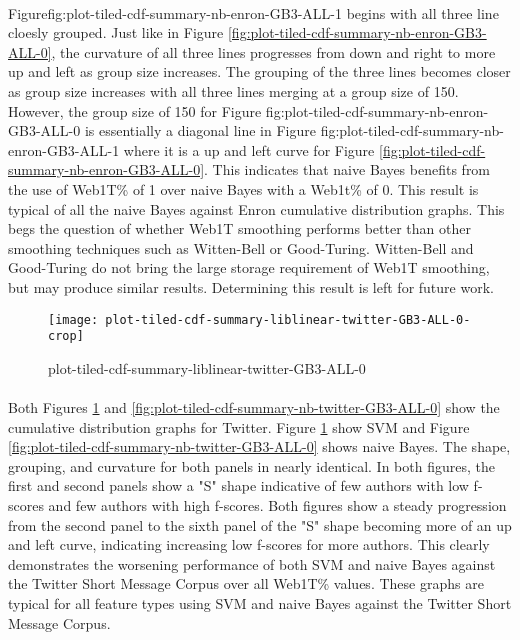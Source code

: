 \paragraph*{} Figure{fig:plot-tiled-cdf-summary-nb-enron-GB3-ALL-1} begins with all three line cloesly grouped.  Just like in Figure \ref{fig:plot-tiled-cdf-summary-nb-enron-GB3-ALL-0}, the curvature of all three lines progresses from down and right to more up and left as group size increases.  The grouping of the three lines becomes closer as group size increases with all three lines merging at a group size of 150. However, the group size of 150 for Figure {fig:plot-tiled-cdf-summary-nb-enron-GB3-ALL-0} is essentially a diagonal line in Figure {fig:plot-tiled-cdf-summary-nb-enron-GB3-ALL-1} where it is a up and left curve for Figure \ref{fig:plot-tiled-cdf-summary-nb-enron-GB3-ALL-0}.  This indicates that naive Bayes benefits from the use of Web1T\% of 1 over naive Bayes with a Web1t\% of 0.  This result is typical of all the naive Bayes against Enron cumulative distribution graphs.  This begs the question of whether Web1T smoothing performs better than other smoothing techniques such as Witten-Bell or Good-Turing.  Witten-Bell and Good-Turing do not bring the large storage requirement of Web1T smoothing, but may produce similar results.  Determining this result is left for future work.

	\begin{figure}[htbp!]
		\begin{center}
		\centering
		\texttt{[image: plot-tiled-cdf-summary-liblinear-twitter-GB3-ALL-0-crop]}
		\caption{plot-tiled-cdf-summary-liblinear-twitter-GB3-ALL-0}
		\label{fig:plot-tiled-cdf-summary-liblinear-twitter-GB3-ALL-0}
		\end{center}
	\end{figure}

\paragraph*{} Both Figures \ref{fig:plot-tiled-cdf-summary-liblinear-twitter-GB3-ALL-0} and \ref{fig:plot-tiled-cdf-summary-nb-twitter-GB3-ALL-0} show the cumulative distribution graphs for Twitter.  Figure \ref{fig:plot-tiled-cdf-summary-liblinear-twitter-GB3-ALL-0} show SVM and Figure \ref{fig:plot-tiled-cdf-summary-nb-twitter-GB3-ALL-0} shows naive Bayes.  The shape, grouping, and curvature for both panels in nearly identical.  In both figures, the first and second panels show a "S" shape indicative of few authors with low f-scores and few authors with high f-scores.  Both figures show a steady progression from the second panel to the sixth panel of the "S" shape becoming more of an up and left curve, indicating increasing low f-scores for more authors.  This clearly demonstrates the worsening performance of both SVM and naive Bayes against the Twitter Short Message Corpus over all Web1T\% values. These graphs are typical for all feature types using SVM and naive Bayes against the Twitter Short Message Corpus.

